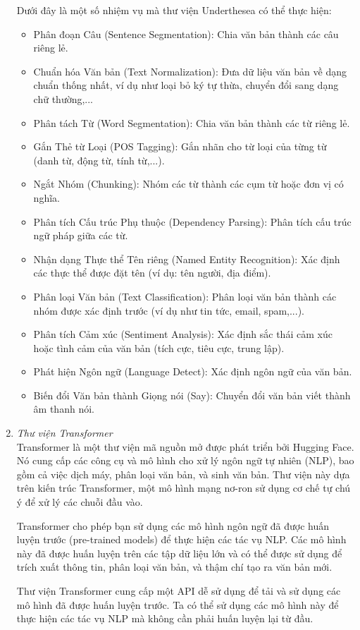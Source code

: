 \begin{enumerate}
    Dưới đây là một số nhiệm vụ mà thư viện Underthesea có thể thực hiện:
    \begin{itemize}
        \item Phân đoạn Câu (Sentence Segmentation): Chia văn bản thành các câu riêng lẻ.
        \item Chuẩn hóa Văn bản (Text Normalization): Đưa dữ liệu văn bản về dạng chuẩn thống nhất, ví dụ như loại bỏ ký tự thừa, chuyển đổi sang dạng chữ thường,...
        \item Phân tách Từ (Word Segmentation): Chia văn bản thành các từ riêng lẻ.
        \item Gắn Thẻ từ Loại (POS Tagging): Gắn nhãn cho từ loại của từng từ (danh từ, động từ, tính từ,...).
        \item Ngắt Nhóm (Chunking): Nhóm các từ thành các cụm từ hoặc đơn vị có nghĩa.
        \item Phân tích Cấu trúc Phụ thuộc (Dependency Parsing): Phân tích cấu trúc ngữ pháp giữa các từ.
        \item Nhận dạng Thực thể Tên riêng (Named Entity Recognition): Xác định các thực thể được đặt tên (ví dụ: tên người, địa điểm).
        \item Phân loại Văn bản (Text Classification): Phân loại văn bản thành các nhóm được xác định trước (ví dụ như tin tức, email, spam,...).
        \item Phân tích Cảm xúc (Sentiment Analysis): Xác định sắc thái cảm xúc hoặc tình cảm của văn bản (tích cực, tiêu cực, trung lập).
        \item Phát hiện Ngôn ngữ (Language Detect): Xác định ngôn ngữ của văn bản.
        \item Biến đổi Văn bản thành Giọng nói (Say): Chuyển đổi văn bản viết thành âm thanh nói.
    \end{itemize}


    \item \textit{Thư viện Transformer}\\
    Transformer là một thư viện mã nguồn mở được phát triển bởi Hugging Face. Nó cung cấp các công cụ và mô hình cho xử lý ngôn ngữ tự nhiên (NLP), bao gồm cả việc dịch máy, phân loại văn bản, và sinh văn bản. Thư viện này dựa trên kiến trúc Transformer, một mô hình mạng nơ-ron sử dụng cơ chế tự chú ý để xử lý các chuỗi đầu vào.

    Transformer cho phép bạn sử dụng các mô hình ngôn ngữ đã được huấn luyện trước (pre-trained models) để thực hiện các tác vụ NLP. Các mô hình này đã được huấn luyện trên các tập dữ liệu lớn và có thể được sử dụng để trích xuất thông tin, phân loại văn bản, và thậm chí tạo ra văn bản mới.

    Thư viện Transformer cung cấp một API dễ sử dụng để tải và sử dụng các mô hình đã được huấn luyện trước. Ta có thể sử dụng các mô hình này để thực hiện các tác vụ NLP mà không cần phải huấn luyện lại từ đầu.
\end{enumerate}

